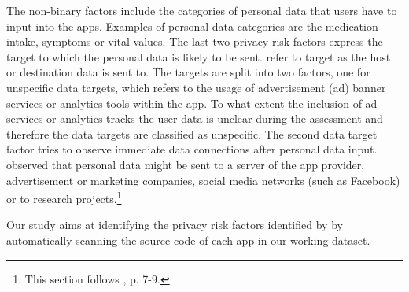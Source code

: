 \documentclass[
	a4paper,
	oneside,
	12pt,
	liststotocnumbered
]{article}
\let\cite\textcite
\begin{document}
The non-binary factors include the categories of personal data that users have to input into the \mH apps. Examples of personal data categories are the medication intake, symptoms or vital values.
The last two privacy risk factors express the target to which the personal data is likely to be sent. 
\cite{Bruggemann2016} refer to target as the host or destination data is sent to.
The targets are split into two factors, one for unspecific data targets, which refers to the usage of advertisement (ad) banner services or analytics tools within the app. 
To what extent the inclusion of ad services or analytics tracks the user data is unclear during the assessment and therefore the data targets are classified as unspecific.
The second data target factor tries to observe immediate data connections after personal data input. 
\cite{Bruggemann2016} observed that personal data might be sent to a server of the app provider, advertisement or marketing companies, social media networks (such as Facebook) or to research projects.\footnote{This section follows \cite{Bruggemann2016}, p. 7-9.}

Our study aims at identifying the privacy risk factors identified by \cite{Bruggemann2016} by automatically scanning the source code of each app in our working dataset. 
\end{document}
